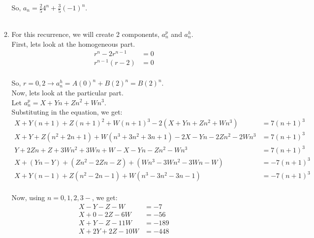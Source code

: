 \documentclass[a4paper]{article}
\begin{document}
\begin{enumerate}
\begin{enumerate}
            So, $a_n = \frac{2}{5}4^n + \frac{3}{5}(-1)^n$. \\ \\

            \item For this recurrence, we will create 2 components, $a^p_n$ and $a^h_n$. \\
            
            First, lets look at the homogeneous part.
            \[
                \begin{split}
                    r^n - 2r^{n-1} &= 0 \\
                    r^{n-1}(r - 2) &= 0 \\
                \end{split}
            \]

            So, $r = 0, 2 \rightarrow a^h_n = A(0)^n + B(2)^n = B(2)^n$. \\

            Now, lets look at the particular part. \\
            Let $a^p_n = X + Yn + Zn^2 + Wn^3$. \\

            Substituting in the equation, we get:
            \[
                \begin{split}
                    X + Y(n+1) + Z(n+1)^2 + W(n+1)^3 - 2(X + Yn + Zn^2 + Wn^3) &=  7(n+1)^3 \\
                    X + Y + Z(n^2 + 2n + 1) + W(n^3 + 3n^2 + 3n + 1) - 2X - Yn - 2Zn^2 - 2Wn^3  &= 7(n+1)^3 \\
                    Y + 2Zn + Z + 3Wn^2 + 3Wn + W - X - Yn - Zn^2 - Wn^3 &= 7(n+1)^3 \\
                    X + (Yn - Y) + (Zn^2 - 2Zn - Z) + (Wn^3 - 3Wn^2 - 3Wn - W)  &= - 7(n+1)^3 \\
                    X + Y(n-1) + Z(n^2 - 2n - 1) + W(n^3 - 3n^2 - 3n - 1) &= - 7(n+1)^3 \\
                \end{split}
            \]

            Now, using $n = 0, 1, 2, 3-$, we get:
            \[
                \begin{split}
                    X - Y - Z - W &= -7 \\
                    X + 0 - 2Z - 6W &= -56 \\
                    X + Y - Z - 11W &= -189 \\
                    X + 2Y + 2Z - 10W &= -448 \\
                \end{split}
            \]
            

\end{enumerate}
\end{enumerate}
\end{document}
